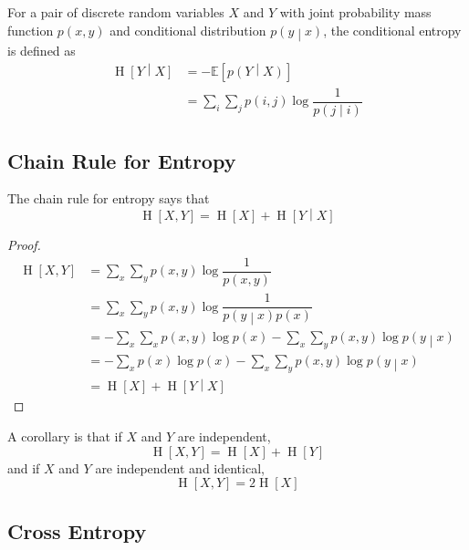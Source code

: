 \documentclass[11pt]{report} %
\begin{document}
For a pair of discrete random variables $X$ and $Y$ with joint probability mass function $p\left(x, y\right)$ and conditional distribution $p\left(y\middle|x\right)$, the conditional entropy is defined as
\begin{align}
\operatorname{H}\left[Y\middle|X\right] &= - \mathbb{E}\left[p\left(Y\middle|X\right)\right] \\
&= \sum_{i}\sum_{j}p\left(i, j\right)\log\dfrac{1}{p\left(j\middle|i\right)}
\end{align}

\subsection{Chain Rule for Entropy}

The chain rule for entropy says that
\begin{equation}
\operatorname{H}\left[X, Y\right] = \operatorname{H}\left[X\right]+ \operatorname{H}\left[Y\middle|X\right]
\end{equation}
\begin{proof}
\begin{align}
\operatorname{H}\left[X, Y\right] &= \sum_{x}\sum_{y}p\left(x, y\right)\log\dfrac{1}{p\left(x, y\right)} \\
&= \sum_{x}\sum_{y}p\left(x, y\right)\log\dfrac{1}{p\left(y\middle|x\right)p\left(x\right)} \\
&= -\sum_{x}\sum_{x}p\left(x, y\right)\log p\left(x\right) -\sum_{x}\sum_{y}p\left(x, y\right)\log p\left(y\middle|x\right) \\
&= -\sum_{x}p\left(x\right)\log p\left(x\right) -\sum_{x}\sum_{y}p\left(x, y\right)\log p\left(y\middle|x\right) \\
&= \operatorname{H}\left[X\right]+ \operatorname{H}\left[Y\middle|X\right]
\end{align}
\end{proof}
A corollary is that if $X$ and $Y$ are independent,
\begin{equation}
\operatorname{H}\left[X, Y\right] = \operatorname{H}\left[X\right]+ \operatorname{H}\left[Y\right]
\end{equation}
and if $X$ and $Y$ are independent and identical,
\begin{equation}
\operatorname{H}\left[X, Y\right] = 2\operatorname{H}\left[X\right]
\end{equation}

\subsection{Cross Entropy}
\end{document}
